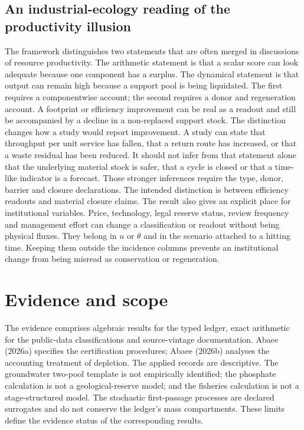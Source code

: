\documentclass[11pt]{article}
\begin{document}
\subsection{An industrial-ecology reading of the productivity illusion}
The framework distinguishes two statements that are often merged in discussions of resource productivity. The arithmetic statement is that a scalar score can look adequate because one component has a surplus. The dynamical statement is that output can remain high because a support pool is being liquidated. The first requires a componentwise account; the second requires a donor and regeneration account. A footprint or efficiency improvement can be real as a readout and still be accompanied by a decline in a non-replaced support stock.
The distinction changes how a study would report improvement. A study can state that throughput per unit service has fallen, that a return route has increased, or that a waste residual has been reduced. It should not infer from that statement alone that the underlying material stock is safer, that a cycle is closed or that a time-like indicator is a forecast. Those stronger inferences require the type, donor, barrier and closure declarations. The intended distinction is between efficiency readouts and material closure claims.
The result also gives an explicit place for institutional variables. Price, technology, legal reserve status, review frequency and management effort can change a classification or readout without being physical fluxes. They belong in \(u\) or \(\theta\) and in the scenario attached to a hitting time. Keeping them outside the incidence columns prevents an institutional change from being misread as conservation or regeneration.
\section{Evidence and scope}
The evidence comprises algebraic results for the typed ledger, exact arithmetic for the public-data classifications and source-vintage documentation. Abaee (2026a) specifies the certification procedures; Abaee (2026b) analyses the accounting treatment of depletion.
The applied records are descriptive. The groundwater two-pool template is not empirically identified; the phosphate calculation is not a geological-reserve model; and the fisheries calculation is not a stage-structured model. The stochastic first-passage processes are declared surrogates and do not conserve the ledger's mass compartments. These limits define the evidence status of the corresponding results.
\end{document}
